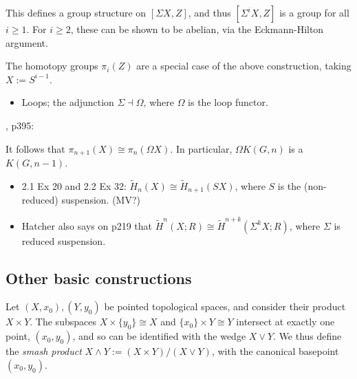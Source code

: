 \documentclass{MetricNotes2023}
\begin{document}
\begin{remark}
This defines a group structure on \([\Sigma X, Z]\), and thus \([\Sigma^i X, Z]\) is a group for all \(i\geq 1\). For \(i\geq 2\), these can be shown to be abelian, via the Eckmann-Hilton argument.
\end{remark}

\begin{remark}\label{2502200937}
The homotopy groups \(\pi_i(Z)\) are a special case of the above construction, taking \(X:=S^{i-1}\). 
\end{remark}


\begin{itemize}
\item Loops; the adjunction \(\Sigma \dashv \Omega\), where \(\Omega\) is the loop functor.
\end{itemize}

\autocite{hatcher}, p395:

\begin{remark}
It follows that \(\pi_{n+1}(X)\cong \pi_n(\Omega X)\). In particular, \(\Omega K(G, n)\) is a \newline\(K(G, n-1)\). 
\end{remark}

\begin{itemize}
\item \autocite{hatcher} 2.1 Ex 20 and 2.2 Ex 32: \(\widetilde H_n(X)\cong \widetilde H_{n+1}(SX)\), where \(S\) is the (non-reduced) suspension.  (MV?) 
\item Hatcher also says on p219 that \(\widetilde H^n(X;R)\cong \widetilde H^{n+k}(\Sigma^kX;R)\), where \(\Sigma \) is reduced suspension.
\end{itemize}

\subsection{Other basic constructions}

\begin{definition}
Let \((X, x_0), (Y, y_0)\) be pointed topological spaces, and consider their product \(X\times Y\). The subspaces \(X\times\{y_0\}\cong X\) and \(\{x_0\}\times Y\cong Y\) intersect at exactly one point, \((x_0, y_0)\), and so can be identified with the wedge \(X\vee Y\). We thus define the \textit{smash product} \(X\wedge Y:=(X\times Y)/(X\vee Y)\), with the canonical basepoint \((x_0,y_0)\).  
\end{definition}
\end{document}
